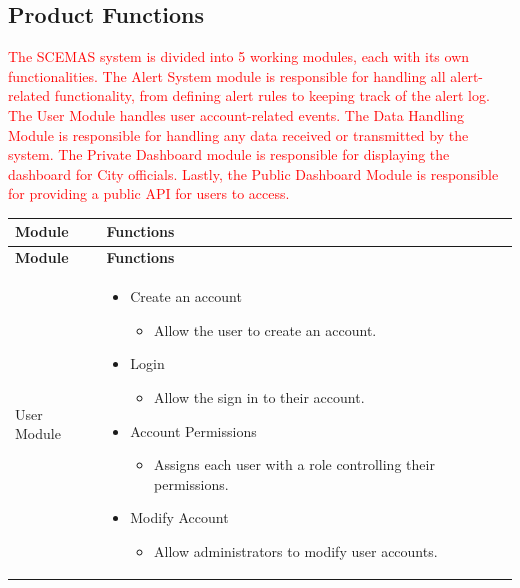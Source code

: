 \documentclass[]{article}
\begin{document}
\subsection{Product Functions}
\label{sub:product_functions}
\textcolor{red}{The SCEMAS system is divided into 5 working modules, each with its own functionalities. The Alert System module is responsible for handling all alert-related functionality, from defining alert rules to keeping track of the alert log. The User Module handles user account-related events. The Data Handling Module is responsible for handling any data received or transmitted by the system. The Private Dashboard module is responsible for displaying the dashboard for City officials. Lastly, the Public Dashboard Module is responsible for providing a public API for users to access.}
\begin{longtable}{|p{3cm}|p{12cm}|}
\hline
\textbf{Module} & \textbf{Functions} \\
\hline
\endfirsthead

\hline
\textbf{Module} & \textbf{Functions} \\
\hline
\endhead

User Module &
\begin{itemize}
    \item Create an account
        \begin{itemize}
            \item Allow the user to create an account.
        \end{itemize}
    \item Login
        \begin{itemize}
            \item Allow the sign in to their account.
        \end{itemize}
    \item Account Permissions
        \begin{itemize}
            \item Assigns each user with a role controlling their permissions.
        \end{itemize}
    \item Modify Account
        \begin{itemize}
            \item Allow administrators to modify user accounts.
        \end{itemize}
\end{itemize}
\\[5pt]
\hline


\end{longtable}
\end{document}
